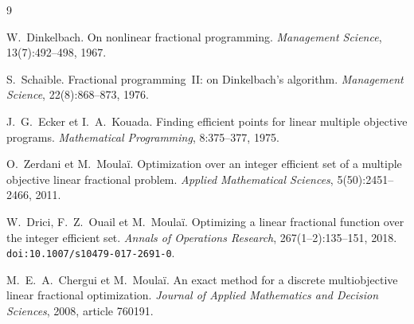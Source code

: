 \documentclass[11pt,a4paper]{article}
\begin{document}
\begin{thebibliography}{9}

W.~Dinkelbach.
\newblock On nonlinear fractional programming.
\newblock \emph{Management Science}, 13(7):492--498, 1967.

S.~Schaible.
\newblock Fractional programming~II: on Dinkelbach's algorithm.
\newblock \emph{Management Science}, 22(8):868--873, 1976.

J.~G.~Ecker et I.~A.~Kouada.
\newblock Finding efficient points for linear multiple objective programs.
\newblock \emph{Mathematical Programming}, 8:375--377, 1975.

O.~Zerdani et M.~Moulaï.
\newblock Optimization over an integer efficient set of a multiple objective
  linear fractional problem.
\newblock \emph{Applied Mathematical Sciences}, 5(50):2451--2466, 2011.

W.~Drici, F.~Z.~Ouail et M.~Moulaï.
\newblock Optimizing a linear fractional function over the integer efficient
  set.
\newblock \emph{Annals of Operations Research}, 267(1--2):135--151, 2018.
\newblock \texttt{doi:10.1007/s10479-017-2691-0}.

M.~E.~A.~Chergui et M.~Moulaï.
\newblock An exact method for a discrete multiobjective linear fractional
  optimization.
\newblock \emph{Journal of Applied Mathematics and Decision Sciences}, 2008,
  article 760191.

\end{thebibliography}
\end{document}

